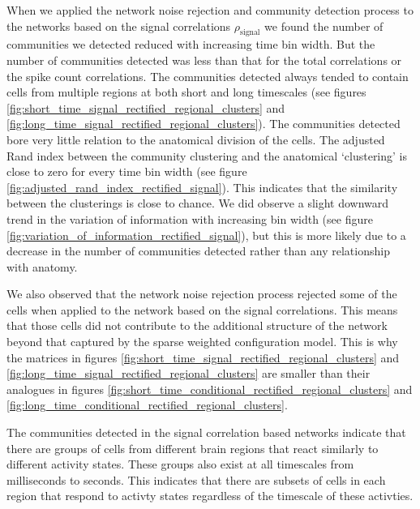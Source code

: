   When we applied the network noise rejection and community detection process to the networks based on the signal correlations $\rho_{\text{signal}}$ we found the number of communities we detected reduced with increasing time bin width. But the number of communities detected was less than that for the total correlations or the spike count correlations. The communities detected always tended to contain cells from multiple regions at both short and long timescales (see figures \ref{fig:short_time_signal_rectified_regional_clusters} and \ref{fig:long_time_signal_rectified_regional_clusters}). The communities detected bore very little relation to the anatomical division of the cells. The adjusted Rand index between the community clustering and the anatomical `clustering' is close to zero for every time bin width (see figure \ref{fig:adjusted_rand_index_rectified_signal}). This indicates that the similarity between the clusterings is close to chance. We did observe a slight downward trend in the variation of information with increasing bin width (see figure \ref{fig:variation_of_information_rectified_signal}), but this is more likely due to a decrease in the number of communities detected rather than any relationship with anatomy.

  We also observed that the network noise rejection process rejected some of the cells when applied to the network based on the signal correlations. This means that those cells did not contribute to the additional structure of the network beyond that captured by the sparse weighted configuration model. This is why the matrices in figures \ref{fig:short_time_signal_rectified_regional_clusters} and \ref{fig:long_time_signal_rectified_regional_clusters} are smaller than their analogues in figures \ref{fig:short_time_conditional_rectified_regional_clusters} and \ref{fig:long_time_conditional_rectified_regional_clusters}.

  The communities detected in the signal correlation based networks indicate that there are groups of cells from different brain regions that react similarly to different activity states. These groups also exist at all timescales from milliseconds to seconds. This indicates that there are subsets of cells in each region that respond to activty states regardless of  the timescale of these activties.


